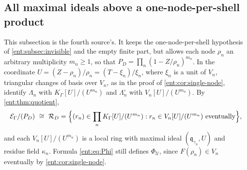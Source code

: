 \documentclass[11pt]{article}
\theoremstyle{plain}
\theoremstyle{plain}
\theoremstyle{plain}
\theoremstyle{definition}
\theoremstyle{definition}
\theoremstyle{definition}
\theoremstyle{definition}
\theoremstyle{remark}
\newcommand{\K}{K_\Gamma}\newcommand{\KD}{K_\Delta}
\newcommand{\E}{\mathcal E_\Gamma}
\newcommand{\RD}{\mathcal R_D}\newcommand{\Ucal}{\mathcal U}
\begin{document}
\subsection{All maximal ideals above a one-node-per-shell product}
\label{ent:sm:subsec:all-maximal}
This subsection is the fourth source's. It keeps the one-node-per-shell
hypothesis of \cref{ent:subsec:invisible} and the empty finite part, but
allows each node $\rho_n$ an arbitrary multiplicity $m_n\ge1$, so that
$P_D=\prod_n(1-Z/\rho_n)^{m_n}$. In the coordinate
$U=(Z-\rho_n)/\rho_n=(T-\xi_n)/\xi_n$, where $\xi_n$ is a unit of $V_n$,
triangular changes of basis over $V_n$, as in the proof of
\cref{ent:cor:single-node}, identify $\Lambda_n$ with $\K[U]/(U^{m_n})$ and
$\Lambda_n^\circ$ with $V_n[U]/(U^{m_n})$. By \cref{ent:thm:quotient},
\begin{equation}\label{ent:sm:eq:local-product}
 \E/(P_D)\ \cong\ \RD=\Bigl\{(r_n)\in\prod_n\K[U]/(U^{m_n}):
   r_n\in V_n[U]/(U^{m_n})\text{ eventually}\Bigr\},
\end{equation}
and each $V_n[U]/(U^{m_n})$ is a local ring with maximal ideal
$(\mathfrak q_{\gamma_n},U)$ and residue field $\kappa_n$. Formula
\eqref{ent:eq:Phi} still defines $\Phi_\Ucal$, since $F(\rho_n)\in V_n$
eventually by \cref{ent:cor:single-node}.
\end{document}
